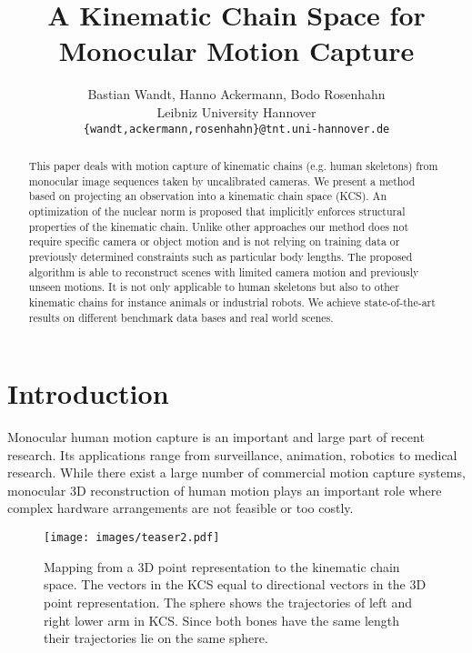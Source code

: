 \documentclass[10pt,letterpaper]{article}
\begin{document}
\title{A Kinematic Chain Space for Monocular Motion Capture}

\author{Bastian Wandt, Hanno Ackermann, Bodo Rosenhahn\\
Leibniz University Hannover\\
{\tt\small \{wandt,ackermann,rosenhahn\}@tnt.uni-hannover.de}
}

\maketitle

\begin{abstract}
This paper deals with motion capture of kinematic chains (e.g. human skeletons) from monocular image sequences taken by uncalibrated cameras. We present a method based on projecting an observation into a \textnormal{kinematic chain space (KCS)}. An optimization of the nuclear norm is proposed that implicitly enforces structural properties of the kinematic chain. Unlike other approaches our method does not require specific camera or object motion and is not relying on training data or previously determined constraints such as particular body lengths. The proposed algorithm is able to reconstruct scenes with limited camera motion and previously unseen motions. It is not only applicable to human skeletons but also to other kinematic chains for instance animals or industrial robots. We achieve state-of-the-art results on different benchmark data bases and real world scenes.

\end{abstract}

\section{Introduction}
Monocular human motion capture is an important and large part of recent research. Its applications range from surveillance, animation, robotics to medical research. While there exist a large number of commercial motion capture systems, monocular 3D reconstruction of human motion plays an important role where complex hardware arrangements are not feasible or too costly.

\begin{figure}[t]
	\begin{center}
		\texttt{[image: images/teaser2.pdf]}
	\end{center}
	\caption{Mapping from a 3D point representation to the kinematic chain space. The vectors in the KCS equal to directional vectors in the 3D point representation. The sphere shows the trajectories of left and right lower arm in KCS. Since both bones have the same length their trajectories lie on the same sphere.}
	\label{fig_teaser}
\end{figure}
\end{document}
